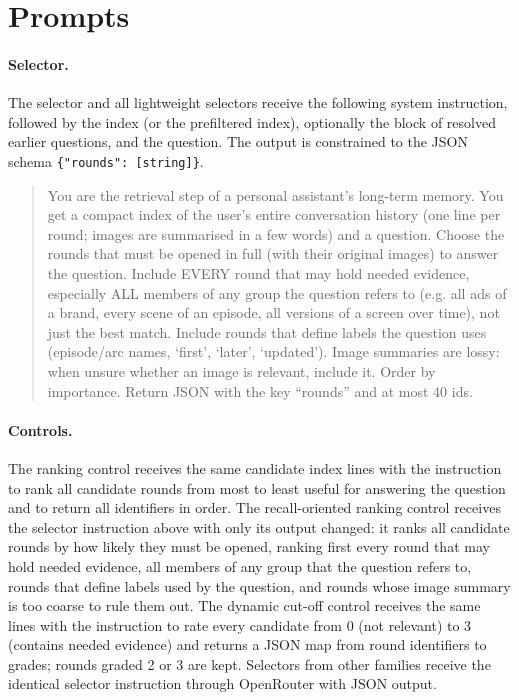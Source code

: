 \section{Prompts}
\label{app:prompts}

\paragraph{Selector.} The \qss{} selector and all lightweight selectors receive the following system instruction, followed by the index (or the prefiltered index), optionally the block of resolved earlier questions, and the question. The output is constrained to the JSON schema \texttt{\{"rounds": [string]\}}.

\begin{quote}\small
You are the retrieval step of a personal assistant's long-term memory. You get a compact index of the user's entire conversation history (one line per round; images are summarised in a few words) and a question. Choose the rounds that must be opened in full (with their original images) to answer the question. Include EVERY round that may hold needed evidence, especially ALL members of any group the question refers to (e.g. all ads of a brand, every scene of an episode, all versions of a screen over time), not just the best match. Include rounds that define labels the question uses (episode/arc names, `first', `later', `updated'). Image summaries are lossy: when unsure whether an image is relevant, include it. Order by importance. Return JSON with the key ``rounds'' and at most 40 ids.
\end{quote}

\paragraph{Controls.} The ranking control receives the same candidate index lines with the instruction to rank all candidate rounds from most to least useful for answering the question and to return all identifiers in order. The recall-oriented ranking control receives the selector instruction above with only its output changed: it ranks all candidate rounds by how likely they must be opened, ranking first every round that may hold needed evidence, all members of any group that the question refers to, rounds that define labels used by the question, and rounds whose image summary is too coarse to rule them out. The dynamic cut-off control receives the same lines with the instruction to rate every candidate from 0 (not relevant) to 3 (contains needed evidence) and returns a JSON map from round identifiers to grades; rounds graded 2 or 3 are kept. Selectors from other families receive the identical selector instruction through OpenRouter with JSON output.


